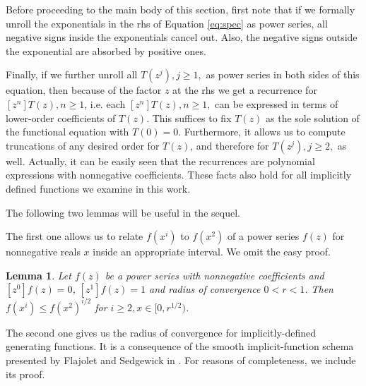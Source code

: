 \documentclass{amsart}
\theoremstyle{plain}
\newtheorem{lemma}{Lemma}
\newcommand{\nicetrees}{T}
\begin{document}
Before proceeding to the main body of this section, first note that if we formally unroll the exponentials in the rhs of Equation \eqref{eq:spec} as power series, all negative signs inside the exponentials cancel out. Also, the negative signs outside the exponential are absorbed by positive ones. 

Finally, if we further unroll all $T(z^j), j\geq 1,$ as power series in both sides of this equation,  then because of the factor $z$ at the rhs
we get a recurrence for $[z^n] T(z), n \geq 1 $, i.e. each $[z^n] T(z), n \geq 1,$ can be expressed in terms of lower-order coefficients of $T(z)$. This suffices to
fix $\nicetrees(z)$ as the sole solution of the functional equation  with $T(0)=0$. Furthermore, it
allows us to compute truncations of any desired order for $T(z)$, and therefore for  $T(z^j), j\geq 2,$ as well. 
Actually, it can be easily seen that the recurrences are polynomial expressions with nonnegative coefficients. These facts also hold for all implicitly defined functions we examine in this work.


The following two lemmas will be useful in the sequel.

The first one allows us to relate $f(x^i)$ to $f(x^2)$ of a power series $f(z)$
for nonnegative reals $x$ inside an appropriate interval. We omit the easy proof.

\begin{lemma}\label{lemma:powerbounds}
Let $f(z)$ be a power series with nonnegative coefficients and
$[z^0] f(z) = 0$, $[z^1] f(z) = 1$ and radius of convergence $0 < r < 1$. 
Then $f(x^i) \leq f(x^2)^{i/2}$ for $i \geq 2, x \in [0,r^{1/2})$.
\end{lemma}

The second one gives us  the radius of convergence for
implicitly-defined generating functions. It is a consequence  of the smooth implicit-function schema presented by Flajolet and Sedgewick in \cite[Theorem VII.3, p. 468]{Flajolet:2009:AC:1506267}. %
For reasons of completeness, we include its proof. %
\end{document}

